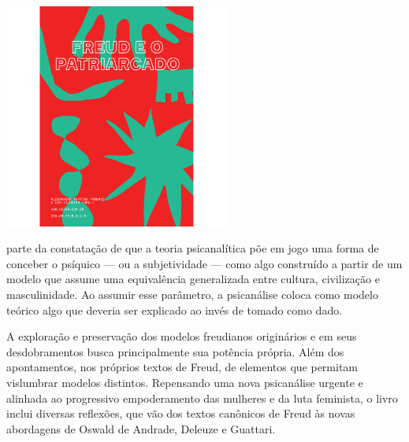 \vfill

\hspace*{-.4cm}\begin{minipage}[c]{.5\linewidth}
\small{
{}}
\end{minipage}


\pagebreak


\begin{center}
\hspace*{.5cm}\includegraphics[width=74mm]{./grid/freud.png}
\end{center}

\hspace*{-7cm}\hrulefill\hspace*{-7cm}

\medskip

 parte da constatação de que a teoria psicanalítica põe em jogo uma forma de conceber o psíquico --- ou a subjetividade --- como algo construído a partir de um modelo que assume uma equivalência generalizada entre cultura, civilização e masculinidade. Ao assumir esse parâmetro, a psicanálise coloca como modelo teórico algo que deveria ser explicado ao invés de tomado como dado.

A exploração e preservação dos modelos freudianos originários e em seus desdobramentos busca principalmente sua potência própria. Além dos apontamentos, nos próprios textos de Freud, de elementos que permitam vislumbrar modelos distintos. Repensando uma nova psicanálise urgente e alinhada ao progressivo empoderamento das mulheres e da luta feminista, o livro inclui diversas reflexões, que vão dos textos canônicos de Freud às novas abordagens de Oswald de Andrade, Deleuze e Guattari.

